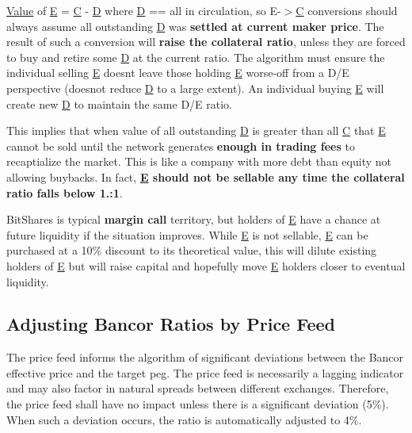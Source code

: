 \mbox{\hyperlink{struct_value}{Value}} of \mbox{\hyperlink{struct_e}{E}} = \mbox{\hyperlink{struct_c}{C}} -\/ \mbox{\hyperlink{struct_d}{D}} where \mbox{\hyperlink{struct_d}{D}} == all in circulation, so E-\/$>$\mbox{\hyperlink{struct_c}{C}} conversions should always assume all outstanding \mbox{\hyperlink{struct_d}{D}} was {\bfseries settled at current maker price}. The result of such a conversion will {\bfseries raise the collateral ratio}, unless they are forced to buy and retire some \mbox{\hyperlink{struct_d}{D}} at the current ratio. The algorithm must ensure the individual selling \mbox{\hyperlink{struct_e}{E}} doesn\textquotesingle{}t leave those holding \mbox{\hyperlink{struct_e}{E}} worse-\/off from a D/E perspective (doesnot reduce \mbox{\hyperlink{struct_d}{D}} to a large extent). An individual buying \mbox{\hyperlink{struct_e}{E}} will create new \mbox{\hyperlink{struct_d}{D}} to maintain the same D/E ratio.

This implies that when value of all outstanding \mbox{\hyperlink{struct_d}{D}} is greater than all \mbox{\hyperlink{struct_c}{C}} that \mbox{\hyperlink{struct_e}{E}} cannot be sold until the network generates {\bfseries enough in trading fees} to recaptialize the market. This is like a company with more debt than equity not allowing buybacks. In fact, {\bfseries \mbox{\hyperlink{struct_e}{E}} should not be sellable any time the collateral ratio falls below 1.\+:1}.

Bit\+Shares is typical {\bfseries margin call} territory, but holders of \mbox{\hyperlink{struct_e}{E}} have a chance at future liquidity if the situation improves. While \mbox{\hyperlink{struct_e}{E}} is not sellable, \mbox{\hyperlink{struct_e}{E}} can be purchased at a 10\% discount to its theoretical value, this will dilute existing holders of \mbox{\hyperlink{struct_e}{E}} but will raise capital and hopefully move \mbox{\hyperlink{struct_e}{E}} holders closer to eventual liquidity.

\subsection*{Adjusting Bancor Ratios by Price Feed }

The price feed informs the algorithm of significant deviations between the Bancor effective price and the target peg. The price feed is necessarily a lagging indicator and may also factor in natural spreads between different exchanges. Therefore, the price feed shall have no impact unless there is a significant deviation (5\%). When such a deviation occurs, the ratio is automatically adjusted to 4\%.


